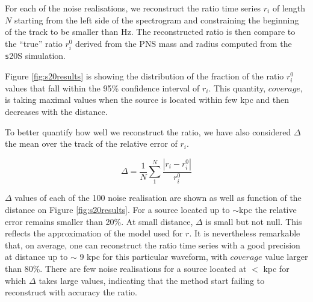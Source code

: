 For each of the noise realisations, we reconstruct the ratio time series {$r_i$}
of length $N$ starting from the left side of the spectrogram and constraining the beginning of the
track to be smaller than \unit[200]{Hz}. The reconstructed ratio is then compare to the ``true'' ratio
{$r_i^0$} derived from the PNS mass and radius computed from the {\texttt s20S} simulation.

Figure \ref{fig:s20results} is showing the distribution of the fraction of the ratio {$r_i^0$} values
that fall within the 95\% confidence interval of {$r_i$}. This quantity, $coverage$, is taking maximal values
when the source is located within few kpc and then decreases with the distance.

To better quantify how well we reconstruct the ratio, we have also considered $\Delta$ the mean
over the track of the relative error of $r_i$. 

\begin{equation}
\Delta=\frac{1}{N}\sum_1^N\frac{|r_i-r_i^0|}{r_i^0}
\end{equation}

$\Delta$ values of each of the 100 noise realisation are shown as well as function of the distance
on Figure \ref{fig:s20results}. For a source located up to $\sim$\unit[9]{kpc} the relative error
remains smaller than 20\%.
At small distance, $\Delta$ is small but not null. This reflects the approximation of the model used for $r$.
It is nevertheless remarkable that, on average, one can reconstruct the ratio time series with a good
precision at distance up to $\sim$ 9 kpc for this particular waveform, with $coverage$ value
larger than 80\%. There are few noise realisations for a source located at $<$ \unit[9]{kpc} for which
$\Delta$ takes large values, indicating that the method start failing to reconstruct with accuracy the ratio.

